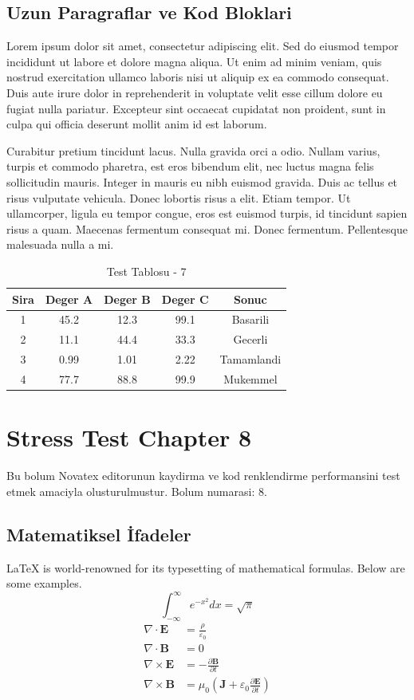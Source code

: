 \documentclass[12pt,a4paper]{article}
\begin{document}
\subsection{Uzun Paragraflar ve Kod Bloklari}
Lorem ipsum dolor sit amet, consectetur adipiscing elit. Sed do eiusmod tempor incididunt ut labore et dolore magna aliqua. Ut enim ad minim veniam, quis nostrud exercitation ullamco laboris nisi ut aliquip ex ea commodo consequat. Duis aute irure dolor in reprehenderit in voluptate velit esse cillum dolore eu fugiat nulla pariatur. Excepteur sint occaecat cupidatat non proident, sunt in culpa qui officia deserunt mollit anim id est laborum.

Curabitur pretium tincidunt lacus. Nulla gravida orci a odio. Nullam varius, turpis et commodo pharetra, est eros bibendum elit, nec luctus magna felis sollicitudin mauris. Integer in mauris eu nibh euismod gravida. Duis ac tellus et risus vulputate vehicula. Donec lobortis risus a elit. Etiam tempor. Ut ullamcorper, ligula eu tempor congue, eros est euismod turpis, id tincidunt sapien risus a quam. Maecenas fermentum consequat mi. Donec fermentum. Pellentesque malesuada nulla a mi.

\begin{table}[h!]
\centering
\begin{tabular}{|c|c|c|c|c|}
\hline
\textbf{Sira} & \textbf{Deger A} & \textbf{Deger B} & \textbf{Deger C} & \textbf{Sonuc} \\
\hline
1 & 45.2 & 12.3 & 99.1 & Basarili \\
2 & 11.1 & 44.4 & 33.3 & Gecerli \\
3 & 0.99 & 1.01 & 2.22 & Tamamlandi \\
4 & 77.7 & 88.8 & 99.9 & Mukemmel \\
\hline
\end{tabular}
\caption{Test Tablosu - 7}
\end{table}

\newpage
\section{Stress Test Chapter 8}
Bu bolum Novatex editorunun kaydirma ve kod renklendirme performansini test etmek amaciyla olusturulmustur. Bolum numarasi: 8.

\subsection{Matematiksel İfadeler}
\LaTeX{} is world-renowned for its typesetting of mathematical formulas. Below are some examples.
\begin{equation}
\int_{-\infty}^{\infty} e^{-x^2} dx = \sqrt{\pi}
\end{equation}
\begin{align}
\nabla \cdot \mathbf{E} &= \frac{\rho}{\varepsilon_0} \\
\nabla \cdot \mathbf{B} &= 0 \\
\nabla \times \mathbf{E} &= -\frac{\partial \mathbf{B}}{\partial t} \\
\nabla \times \mathbf{B} &= \mu_0\left(\mathbf{J} + \varepsilon_0 \frac{\partial \mathbf{E}}{\partial t}\right)
\end{align}
\end{document}
